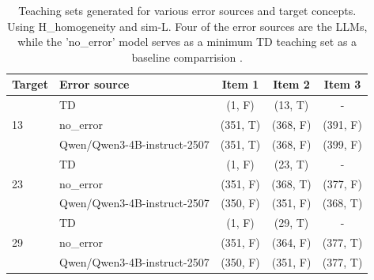 \begin{table}[h]
\centering
\begin{tabular}{llccc}
\toprule
Target & Error source & Item 1 & Item 2 & Item 3 \\
\midrule
\multirow{3}{*}{13} & TD & (1, F) & (13, T) & - \\
 & no\_error & (351, T) & (368, F) & (391, F) \\
 & Qwen/\allowbreak Qwen3-4B-instruct-2507 & (351, T) & (368, F) & (399, F) \\
\midrule
\multirow{3}{*}{23} & TD & (1, F) & (23, T) & - \\
 & no\_error & (351, F) & (368, T) & (377, F) \\
 & Qwen/\allowbreak Qwen3-4B-instruct-2507 & (350, F) & (351, F) & (368, T) \\
\midrule
\multirow{3}{*}{29} & TD & (1, F) & (29, T) & - \\
 & no\_error & (351, F) & (364, F) & (377, T) \\
 & Qwen/\allowbreak Qwen3-4B-instruct-2507 & (350, F) & (351, F) & (377, T) \\
\midrule
\bottomrule
\end{tabular}
\caption{Teaching sets generated for various error sources and target concepts. Using H\_homogeneity and sim-L. Four of the error sources are the LLMs, while the 'no\_error' model serves as a minimum TD teaching set as a baseline comparrision .}
\end{table}
